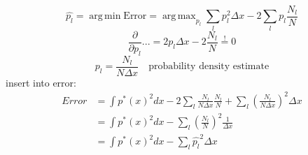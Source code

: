 \documentclass[11pt]{article}
\DeclareMathOperator*{\argmin}{arg\,min}
\DeclareMathOperator*{\argmax}{arg\,max}
\begin{document}
           \begin{equation*}
             \hat{p_l} = \argmin \text{Error} = \argmax_{p_l} \sum_l p_l^2 \Delta x - 2\sum_l p_l \frac{N_l}{N}
           \end{equation*}
           \begin{equation*}
             \frac{\partial}{\partial p_l}... = 2 p_l \Delta x - 2 \frac{N_l}{N} \overset{!}{=} 0
           \end{equation*}
           \begin{equation*}
             p_l = \frac{N_l}{N\Delta x} \quad \text{probability density estimate}
           \end{equation*}
           insert into error:
           \begin{equation*}
             \begin{align*}
               Error &= \int p^*(x)^2dx-2 \sum_l \frac{N_l}{N\Delta x}\frac{N_l}{N} + \sum_l(\frac{N_l}{N\Delta x})^2 \Delta x \\
               &= \int p^*(x)^2dx - \sum_l(\frac{N_l}{N})^2\frac{1}{\Delta x} \\
               &= \int p^*(x)^2dx - \sum_l \hat{p_l}^2 \Delta x
             \end{align*}
           \end{equation*}
\end{document}
